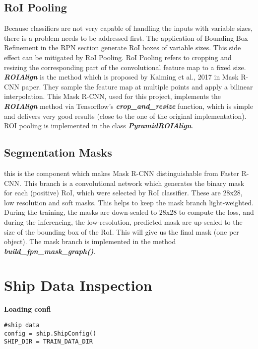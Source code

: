\subsection{RoI Pooling}
\label{subsec:roi-pooling}

Because classifiers are not very capable of handling the inputs with variable sizes, there is a problem needs to be addressed first. The application of Bounding Box Refinement in the RPN section generate RoI boxes of variable sizes. This side effect can be mitigated by RoI Pooling. RoI Pooling refers to cropping and resizing the corresponding part of the convolutional feature map to a   fixed size. \textbf{\textit{ROIAlign}} is the method which is proposed by Kaiming et al., 2017 in Mask R-CNN paper. They sample the feature map at multiple points and apply a bilinear interpolation. This Mask R-CNN, used for this project, implements the \textbf{\textit{ROIAlign}} method via Tensorflow’s \textbf{\textit{crop\_and\_resize}} function, which is simple and delivers very good results (close to the one of the original implementation). ROI pooling is implemented in the class \textbf{\textit{PyramidROIAlign}}.

\subsection{Segmentation Masks}
\label{subsec:seg-mask}

this is the component which makes Mask R-CNN distinguishable from Faster R-CNN. This branch is a convolutional network which generates the binary mask for each (positive) RoI, which were selected by RoI classifier. These are 28x28, low resolution and soft masks. This helps to keep the mask branch light-weighted. During the training, the masks are down-scaled to 28x28 to compute the loss, and during the inferencing, the low-resolution, predicted mask are up-scaled to the size of the bounding box of the RoI. This will give us the final mask (one per object). The mask branch is implemented in the method \textbf{\textit{build\_fpn\_mask\_graph()}}.

\section{Ship Data Inspection}
\label{sec:shipdata}

\textbf{Loading confi}
\begin{lstlisting}
#ship data
config = ship.ShipConfig()
SHIP_DIR = TRAIN_DATA_DIR
\end{lstlisting}

